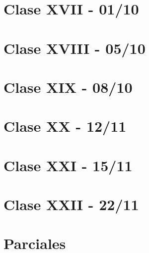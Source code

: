 \documentclass[12pt,a4paper]{book}
\begin{document}
\chapter{Clase XVII - 01/10}


\chapter{Clase XVIII - 05/10}


\chapter{Clase XIX - 08/10}


\chapter{Clase XX - 12/11}


\chapter{Clase XXI - 15/11}


\chapter{Clase XXII - 22/11}


\chapter{Parciales}


\blankpage



\nocite{*}
\end{document}
